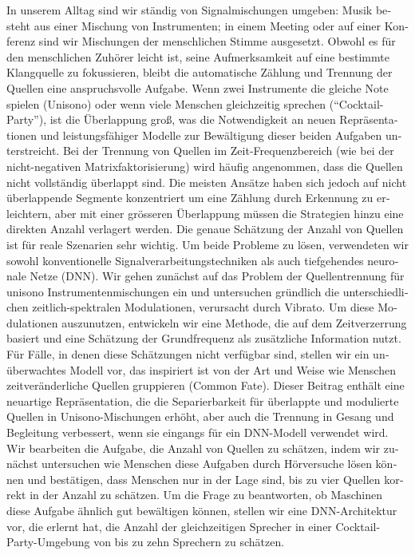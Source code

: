 \begin{otherlanguage}{ngerman}
In unserem Alltag sind wir ständig von Signalmischungen umgeben: Musik  besteht aus einer Mischung von Instrumenten; in einem Meeting oder auf einer Konferenz sind wir Mischungen der menschlichen Stimme ausgesetzt.
Obwohl es für den menschlichen Zuhörer leicht ist, seine Aufmerksamkeit auf eine bestimmte Klangquelle zu fokussieren, bleibt die automatische Zählung und Trennung der Quellen eine anspruchsvolle Aufgabe.
Wenn zwei Instrumente die gleiche Note spielen (Unisono) oder wenn viele Menschen gleichzeitig sprechen (``Cocktail-Party''), ist die Überlappung groß, was die Notwendigkeit an neuen Repräsentationen und leistungsfähiger Modelle zur Bewältigung dieser beiden Aufgaben unterstreicht.
Bei der Trennung von Quellen im Zeit-Frequenzbereich (wie bei der nicht-negativen Matrixfaktorisierung) wird häufig angenommen, dass die Quellen nicht vollständig überlappt sind.
Die meisten Ansätze haben sich jedoch auf nicht überlappende Segmente konzentriert um eine Zählung durch Erkennung zu erleichtern, aber mit einer grösseren Überlappung müssen die Strategien hinzu eine direkten  Anzahl verlagert werden.
Die genaue Schätzung der Anzahl von Quellen ist für reale Szenarien sehr wichtig.
Um beide Probleme zu lösen, verwendeten wir sowohl konventionelle Signalverarbeitungstechniken als auch tiefgehendes neuronale Netze (DNN).
Wir gehen zunächst auf das Problem der Quellentrennung für unisono Instrumentenmischungen ein und untersuchen gründlich die unterschiedlichen zeitlich-spektralen Modulationen, verursacht durch Vibrato. 
Um diese Modulationen auszunutzen, entwickeln wir eine Methode, die auf dem Zeitverzerrung basiert und eine Schätzung der Grundfrequenz als zusätzliche Information nutzt.
Für Fälle, in denen diese Schätzungen nicht verfügbar sind, stellen wir ein unüberwachtes Modell vor, das inspiriert ist von der Art und Weise  wie Menschen zeitveränderliche Quellen gruppieren (Common Fate).
Dieser Beitrag enthält eine neuartige Repräsentation, die die Separierbarkeit für überlappte und modulierte Quellen in  Unisono-Mischungen erhöht, aber auch die Trennung in Gesang und Begleitung verbessert, wenn sie eingangs für ein DNN-Modell verwendet wird.
Wir bearbeiten die Aufgabe, die Anzahl von Quellen zu schätzen, indem wir zunächst untersuchen wie Menschen diese Aufgaben durch Hörversuche lösen können und bestätigen, dass Menschen nur in der Lage sind, bis zu vier Quellen korrekt in der Anzahl zu schätzen.
Um die Frage zu beantworten, ob Maschinen diese Aufgabe ähnlich gut bewältigen können, stellen wir eine DNN-Architektur vor, die erlernt hat, die Anzahl der gleichzeitigen Sprecher in einer Cocktail-Party-Umgebung von bis zu zehn Sprechern zu schätzen.

\end{otherlanguage}
